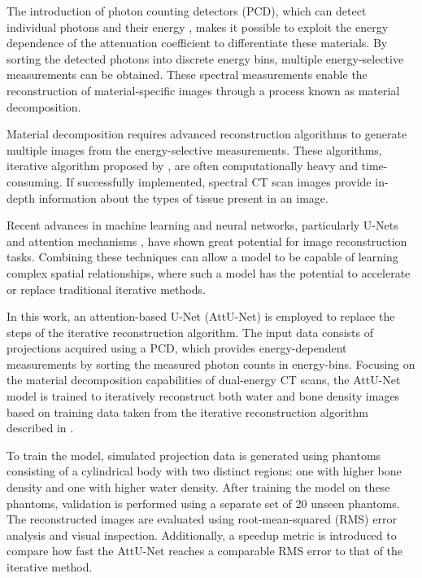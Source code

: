 \documentclass{article}
\begin{document}
The introduction of photon counting detectors (PCD), which can detect individual photons and their energy \citep{taguchi2013photon}, makes it possible to exploit the energy dependence of the attenuation coefficient to differentiate these materials. By sorting the detected photons into discrete energy bins, multiple energy-selective measurements can be obtained. These spectral measurements enable the reconstruction of material-specific images through a process known as material decomposition.

Material decomposition requires advanced reconstruction algorithms to generate multiple images from the energy-selective measurements. These algorithms, iterative algorithm proposed by \citep{mechlem2018joint}, are often computationally heavy and time-consuming. If successfully implemented, spectral CT scan images provide in-depth information about the types of tissue present in an image.

Recent advances in machine learning and neural networks, particularly U-Nets \citep{oktay2018attentionunet} and attention mechanisms  \citep{vaswani2017attention}, have shown great potential for image reconstruction tasks. Combining these techniques can allow a model to be capable of learning complex spatial relationships, where such a model has the potential to accelerate or replace traditional iterative methods.

In this work, an attention-based U-Net (AttU-Net) is employed to replace the steps of the iterative reconstruction algorithm. The input data consists of projections acquired using a PCD, which provides energy-dependent measurements by sorting the measured photon counts in energy-bins. Focusing on the material decomposition capabilities of dual-energy CT scans, the AttU-Net model is trained to iteratively reconstruct both water and bone density images based on training data taken from the iterative reconstruction algorithm described in \citep{mechlem2018joint}.

To train the model, simulated projection data is generated using phantoms consisting of a cylindrical body with two distinct regions: one with higher bone density and one with higher water density. After training the model on these phantoms, validation is performed using a separate set of 20 unseen phantoms. The reconstructed images are evaluated using root-mean-squared (RMS) error analysis and visual inspection. Additionally, a speedup metric is introduced to compare how fast the AttU-Net reaches a comparable RMS error to that of the iterative method.
\end{document}
